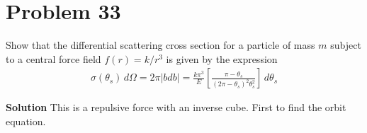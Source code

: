 \documentclass[]{article}
\newcommand{\bd}{\textbf}
\begin{document}
	\section{Problem 33}
	
	Show that the differential scattering cross section for a particle of mass $ m $ subject to a central force field $ f(r) = k / r^3 $ is given by the expression
	\begin{equation}
		\begin{split}
			\sigma(\theta_s) \, d\Omega = 2\pi \left| bdb \right| = \frac{k\pi^3}{E} \left[ \frac{\pi - \theta_s}{(2\pi - \theta_s)^2 \theta_s^2} \right] \, d\theta_s 
		\end{split}
	\end{equation}

	\bd{Solution} This is a repulsive force with an inverse cube. First to find the orbit equation.
	
\end{document}
